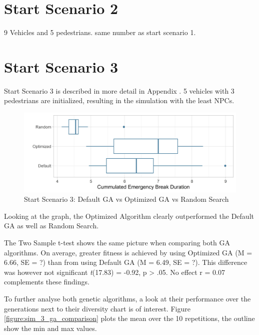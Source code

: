 \section{Start Scenario 2}
9 Vehicles and 5 pedestrians. same number as start scenario 1.


\section{Start Scenario 3}
Start Scenario 3 is described in more detail in Appendix . 5 vehicles with 3 pedestrians are initialized, resulting in the simulation with the least NPCs.
\begin{figure}[ht] 
	\label{figure:sim_3_comparison}
	\includegraphics[width=1\linewidth]{simulations/evaluation/plots/sim_3_comparison}
	\caption{Start Scenario 3: Default GA vs Optimized GA vs Random Search}
\end{figure}

Looking at the graph, the Optimized Algorithm clearly outperformed the Default GA as well as Random Search.

The Two Sample t-test shows the same picture when comparing both GA algorithms. On average, greater fitness is achieved by using Optimized GA (M = 6.66, SE = ?) than from using Default GA (M = 6.49, SE = ?). This difference was however not significant \textit{t}(17.83) = -0.92, p > .05. No effect r = 0.07  complements these findings.

To further analyse both genetic algorithms, a look at their performance over the generations next to their diversity chart is of interest. Figure \ref{figure:sim_3_ga_comparison} plots the mean over the 10 repetitions, the outline show the min and max values.

